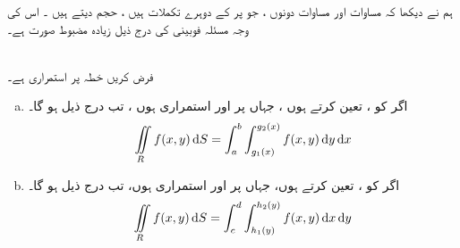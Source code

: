 ہم نے دیکھا کہ مساوات  اور مساوات  دونوں  ، جو  پر  کے دوہرے تکملات ہیں  ، حجم  دیتے ہیں ۔ اس کی وجہ مسئلہ فوبینی   کی  درج ذیل  زیادہ مضبوط  صورت ہے۔


\\
فرض کریں خطہ  پر  استمراری ہے۔
\begin{enumerate}[a.]
\item
اگر   کو  ،  تعین کرتے ہوں ، جہاں  پر  اور  استمراری ہوں  ، تب درج ذیل ہو گا۔
\begin{align*}
\iint\limits_R f(x,y)\dif S=\int_a^b\int_{g_1(x)}^{g_2(x)}f(x,y)\dif y\dif x
\end{align*} 
\item

اگر   کو  ،  تعین کرتے ہوں،  جہاں  پر  اور  استمراری ہوں،   تب درج ذیل ہو گا۔
\begin{align*}
\iint\limits_R f(x,y)\dif S=\int_c^d\int_{h_1(y)}^{h_2(y)}f(x,y)\dif x\dif y
\end{align*} 
\end{enumerate}

